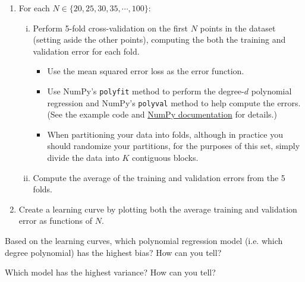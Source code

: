 \begin{problem}[14]
\begin{enumerate}
	\item For each $N \in \{20, 25, 30, 35, \cdots, 100\}$:
	      \begin{enumerate}[i.]
		      \item Perform 5-fold cross-validation on the first $N$ points in the dataset (setting aside the other points), computing the both the training and validation error for each fold.
		            \begin{itemize}
			            \item Use the mean squared error loss as the error function.
			            \item Use NumPy's \texttt{polyfit} method to perform the degree-$d$ polynomial regression and NumPy's \texttt{polyval} method to help compute the errors.
			                  (See the example code and \href{https://docs.scipy.org/doc/NumPy/reference/routines.polynomials.poly1d.html}{NumPy documentation} for details.)
			            \item When partitioning your data into folds, although in practice you should randomize your partitions, for the purposes of this set, simply divide the data into $K$ contiguous blocks.
		            \end{itemize}
		      \item Compute the average of the training and validation errors from the 5 folds.
	      \end{enumerate}
	\item Create a learning curve by plotting both the average training and validation error as functions of $N$.
\end{enumerate}

\end{problem}
\begin{solution}
\end{solution}

\begin{problem}[3]
Based on the learning curves, which polynomial regression model (i.e. which degree polynomial) has the highest bias? How can you tell?
\end{problem}
\begin{solution}

\end{solution}

\begin{problem}[3]
Which model has the highest variance? How can you tell?
\end{problem}
\begin{solution}

\end{solution}

